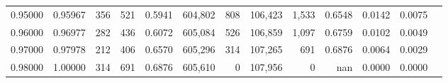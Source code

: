 \begin{tabular}{rrrrrrrrrrrrr}
0.95000 & 0.95967 &   356 & 521 &                                     0.5941 & 604,802 &     808 & 106,423 &   1,533 & 0.6548 & 0.0142 & 0.0075 \\
0.96000 & 0.96977 &   282 & 436 &                                     0.6072 & 605,084 &     526 & 106,859 &   1,097 & 0.6759 & 0.0102 & 0.0049 \\
0.97000 & 0.97978 &   212 & 406 &                                     0.6570 & 605,296 &     314 & 107,265 &     691 & 0.6876 & 0.0064 & 0.0029 \\
0.98000 & 1.00000 &   314 & 691 &                                     0.6876 & 605,610 &       0 & 107,956 &       0 &    nan & 0.0000 & 0.0000 \\
\bottomrule
\end{tabular}
